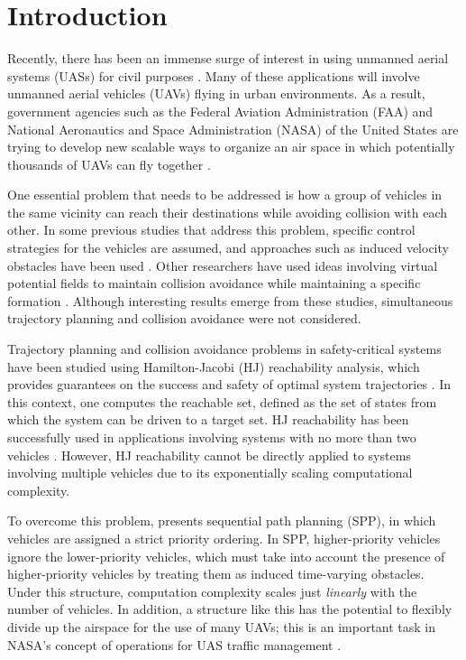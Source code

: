 \section{Introduction}
Recently, there has been an immense surge of interest in using unmanned aerial systems (UASs) for civil purposes \cite{Debusk10, Amazon16, AUVSI16, BBC16}. Many of these applications will involve unmanned aerial vehicles (UAVs) flying in urban environments. As a result, government agencies such as the Federal Aviation Administration (FAA) and National Aeronautics and Space Administration (NASA) of the United States are trying to develop new scalable ways to organize an air space in which potentially thousands of UAVs can fly together \cite{FAA13, Kopardekar16}.

One essential problem that needs to be addressed is how a group of vehicles in the same vicinity can reach their destinations while avoiding collision with each other. In some previous studies that address this problem, specific control strategies for the vehicles are assumed, and approaches such as induced velocity obstacles have been used \cite{Fiorini98, Chasparis05, Vandenberg08}. Other researchers have used ideas involving virtual potential fields to maintain collision avoidance while maintaining a specific formation \cite{Saber02, Chuang07}. Although interesting results emerge from these studies, simultaneous trajectory planning and collision avoidance were not considered. 

Trajectory planning and collision avoidance problems in safety-critical systems have been studied using Hamilton-Jacobi (HJ) reachability analysis, which provides guarantees on the success and safety of optimal system trajectories \cite{Barron90, Mitchell05, Bokanowski10, Margellos11, Fisac15}. In this context, one computes the reachable set, defined as the set of states from which the system can be driven to a target set. HJ reachability has been successfully used in applications involving systems with no more than two vehicles \cite{Mitchell05, Ding08, Huang11, Bayen07}. However, HJ reachability cannot be directly applied to systems involving multiple vehicles due to its exponentially scaling computational complexity. 

To overcome this problem, \cite{Chen15} presents sequential path planning (SPP), in which vehicles are assigned a strict priority ordering. In SPP, higher-priority vehicles ignore the lower-priority vehicles, which must take into account the presence of higher-priority vehicles by treating them as induced time-varying obstacles. Under this structure, computation complexity scales just \textit{linearly} with the number of vehicles. In addition, a structure like this has the potential to flexibly divide up the airspace for the use of many UAVs; this is an important task in NASA's concept of operations for UAS traffic management \cite{Kopardekar16}. 

